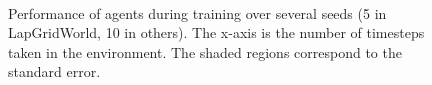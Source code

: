 \documentclass{article}
\begin{document}
\begin{figure}[ht!]
\begin{center}
    \\
    \caption{Performance of agents during training over several seeds (5 in LapGridWorld, 10 in others). The x-axis is the number of timesteps taken in the environment. The shaded regions correspond to the standard error.}
    \label{fig:main_results}
\end{center}
\vskip -0.2in
\end{figure}
\end{document}
